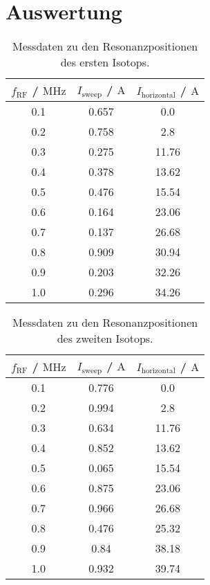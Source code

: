 \section{Auswertung}
\label{sec:Auswertung}

\begin{table}[H]
    \centering
    \caption{Messdaten zu den Resonanzpositionen des ersten Isotops.}
    \label{tab:DatenIsotop1}
    \begin{tabular}{c c c}
        \toprule
        $f_{\text{RF}}$ / $\si{\mega\hertz}$ & $I_{\text{sweep}}$ / $\si{\ampere}$  & $I_{\text{horizontal}}$ / $\si{\ampere}$ \\
        \midrule
        0.1  &  0.657  &  0.0  \\
        0.2  &  0.758  &  2.8  \\
        0.3  &  0.275  &  11.76  \\
        0.4  &  0.378  &  13.62  \\
        0.5  &  0.476  &  15.54  \\
        0.6  &  0.164  &  23.06  \\
        0.7  &  0.137  &  26.68  \\
        0.8  &  0.909  &  30.94  \\
        0.9  &  0.203  &  32.26  \\
        1.0  &  0.296  &  34.26  \\
        \bottomrule
    \end{tabular}
\end{table}

\begin{table}[H]
    \centering
    \caption{Messdaten zu den Resonanzpositionen des zweiten Isotops.}
    \label{tab:DatenIsotop1}
    \begin{tabular}{c c c}
        \toprule
        $f_{\text{RF}}$ / $\si{\mega\hertz}$ & $I_{\text{sweep}}$ / $\si{\ampere}$  & $I_{\text{horizontal}}$ / $\si{\ampere}$ \\
        \midrule
        0.1  &  0.776  &  0.0  \\
        0.2  &  0.994  &  2.8  \\
        0.3  &  0.634  &  11.76  \\
        0.4  &  0.852  &  13.62  \\
        0.5  &  0.065  &  15.54  \\
        0.6  &  0.875  &  23.06  \\
        0.7  &  0.966  &  26.68  \\
        0.8  &  0.476  &  25.32  \\
        0.9  &  0.84  &  38.18  \\
        1.0  &  0.932  &  39.74  \\
        \bottomrule
    \end{tabular}
\end{table}

